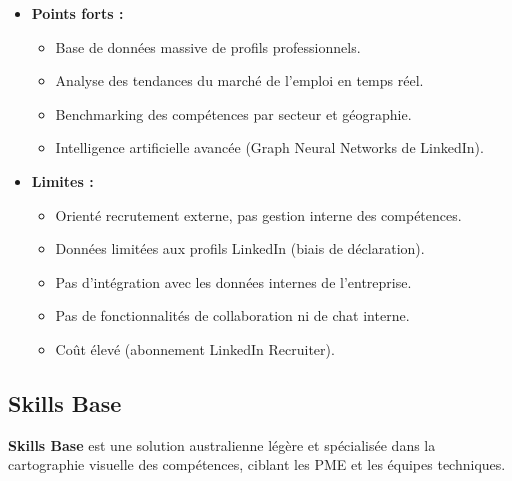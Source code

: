 \documentclass[12pt,a4paper]{article}
\begin{document}
\begin{itemize}[leftmargin=*]
    \item \textbf{Points forts :}
    \begin{itemize}[leftmargin=*, label=--]
        \item Base de données massive de profils professionnels.
        \item Analyse des tendances du marché de l'emploi en temps réel.
        \item Benchmarking des compétences par secteur et géographie.
        \item Intelligence artificielle avancée (Graph Neural Networks de LinkedIn).
    \end{itemize}
    \item \textbf{Limites :}
    \begin{itemize}[leftmargin=*, label=--]
        \item Orienté recrutement externe, pas gestion interne des compétences.
        \item Données limitées aux profils LinkedIn (biais de déclaration).
        \item Pas d'intégration avec les données internes de l'entreprise.
        \item Pas de fonctionnalités de collaboration ni de chat interne.
        \item Coût élevé (abonnement LinkedIn Recruiter).
    \end{itemize}
\end{itemize}

\subsection{Skills Base}

\textbf{Skills Base} est une solution australienne légère et spécialisée dans la cartographie visuelle des compétences, ciblant les PME et les équipes techniques.
\end{document}
